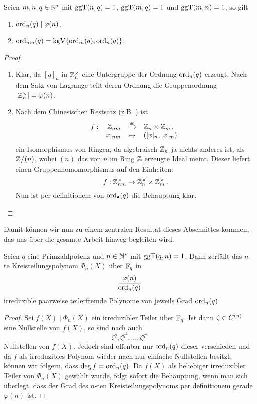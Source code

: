\begin{lemma}
  \label{lemma:rechenregeln_ordn}
  Seien $m,n,q \in \mathbb{N}^\ast$ mit \newline $\operatorname{ggT}(n,q)=1$,
  $\operatorname{ggT}(m,q) = 1$ und $\operatorname{ggT}(m,n) = 1$, so gilt
  \begin{enumerate}
    \item $\operatorname{ord}_n(q) \mid \varphi(n)$,
    \item $\operatorname{ord}_{mn}(q) = \operatorname{kgV}\{ \operatorname{ord}_m(q), \operatorname{ord}_n(q)\}$.
  \end{enumerate}
\end{lemma}
\begin{proof}
  \begin{enumerate}
    \item Klar, da $[q]_n$ in $\mathbb{Z}_n^\times$ eine Untergruppe der Ordnung
      $\operatorname{ord}_n(q)$ erzeugt. 
      Nach dem Satz von Lagrange teilt deren Ordnung die 
      Gruppenordnung $|\mathbb{Z}_n^\times| = \varphi(n)$.
    \item Nach dem Chinesischen Restsatz 
      (z.B. \autocite[Kapitel 2 Satz 12]{bosch2009algebra}) ist
      \[ f: \funcdef{ \Z_{nm} &\xrightarrow{\cong}& \Z_n \times \Z_m\,,\\{} 
          [x]_{nm} &\mapsto& ([x]_n, [x]_m)}\]
      ein Isomorphismus von Ringen, 
      da algebraisch $\mathbb{Z}_n$ ja nichts anderes ist, als
      $\mathbb{Z}\big/(n)$, wobei $(n)$ das von $n$ im Ring $\mathbb{Z}$ erzeugte Ideal meint.
      Dieser liefert einen Gruppenhomomorphismus auf
      den Einheiten:
      \[ f: \mathbb{Z}_{nm}^\times \to \mathbb{Z}_n^\times \times \mathbb{Z}_m^\times\,.\]
      Nun ist per definitionem von $\operatorname{ord}_{\bullet}(q)$ die Behauptung
      klar.
  \end{enumerate}
\end{proof}

Damit können wir nun zu einem zentralen Resultat dieses Abschnittes kommen, das
uns über die gesamte Arbeit hinweg begleiten wird.

\begin{satz}
  \label{satz:zerfall_kreisteilungspolys}
  Seien $q$ eine Primzahlpotenz und $n\in \mathbb{N}^\ast$ mit $\operatorname{ggT}(q,n)=1$. Dann
  zerfällt das $n$-te Kreisteilungspolynom $\Phi_n(X)$ über $\mathbb{F}_q$ in
  \[ \frac{\varphi(n)}{\operatorname{ord}_n(q)}\]
  irreduzible paarweise teilerfremde Polynome von jeweils Grad $\operatorname{ord}_n(q)$.
\end{satz}
\begin{proof}
  Sei $f(X) \mid \Phi_n(X)$ ein irreduzibler Teiler über $\mathbb{F}_q$. Ist dann
  $\zeta \in C^{(n)}$ eine Nullstelle von $f(X)$, so sind 
  nach  auch
  \[ \zeta^q, \zeta^{q^2}, \ldots, \zeta^{q^n} \]
  Nullstellen von $f(X)$. Jedoch sind offenbar nur $\operatorname{ord}_n(q)$ dieser 
  verschieden und da $f$ als irreduzibles Polynom wieder nach 
   nur einfache Nullstellen besitzt,
  können wir folgern, dass $\deg f = \operatorname{ord}_n(q)$.
  Da $f(X)$ als beliebiger irreduzibler Teiler von $\Phi_n(X)$ gewählt wurde,
  folgt sofort die Behauptung, wenn man sich überlegt, dass der Grad des
  $n$-ten Kreisteilungspolynoms per definitionem gerade $\varphi(n)$ ist.
\end{proof}


